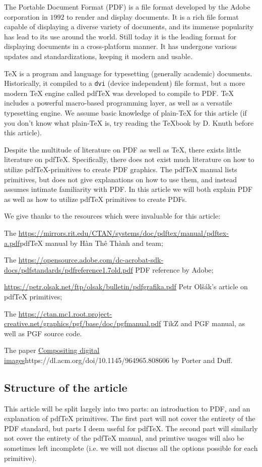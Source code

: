 The Portable Document Format (PDF) is a file format developed by the Adobe corporation in $1992$ to render and
display documents.
It is a rich file format capable of displaying a diverse variety of documents, and its immense popularity has
lead to its use around the world.
Still today it is the leading format for displaying documents in a cross-platform manner.
It has undergone various updates and standardizations, keeping it modern and usable.

\TeX{} is a program and language for typesetting (generally academic) documents.
Historically, it compiled to a {\tt dvi} (device independent) file format, but a more modern \TeX{} engine
called pdf\TeX{} was developed to compile to PDF.
\TeX{} includes a powerful macro-based programming layer, as well as a versatile typesetting engine.
We assume basic knowledge of plain-\TeX{} for this article (if you don't know what plain-\TeX{} is, try reading
the \TeX book by D. Knuth before this article).

Despite the multitude of literature on PDF as well as \TeX, there exists little literature on pdf\TeX.
Specifically, there does not exist much literature on how to utilize pdf\TeX-primitives to create PDF graphics.
The pdf\TeX{} manual lists primitives, but does not give explanations on how to use them, and instead assumes
intimate familiarity with PDF.
In this article we will both explain PDF as well as how to utilize pdf\TeX{} primitives to create PDFs.

We give thanks to the resources which were invaluable for this article:
\blist
    \item The \url{https://mirrors.rit.edu/CTAN/systems/doc/pdftex/manual/pdftex-a.pdf}{pdf\TeX{} manual} by
    H\`an Th\^e\llap{\raise 0.5ex\hbox{\'{}}} Th\`anh and team;
    \item The \url{https://opensource.adobe.com/dc-acrobat-sdk-docs/pdfstandards/pdfreference1.7old.pdf}
    {PDF reference} by Adobe;
    \item \url{https://petr.olsak.net/ftp/olsak/bulletin/pdfgrafika.pdf}
    {Petr Ol\v s\'ak's article on pdf\TeX{} primitives};
    \item The \url{https://ctan.mc1.root.project-creative.net/graphics/pgf/base/doc/pgfmanual.pdf}
    {TikZ and PGF manual}, as well as PGF source code.
    \item The paper \url{Compositing digital images}{https://dl.acm.org/doi/10.1145/964965.808606}
        by Porter and Duff.
\elist

\subsection*{Structure of the article}

This article will be split largely into two parts: an introduction to PDF, and an explanation of pdf\TeX{}
primitives.
The first part will not cover the entirety of the PDF standard, but parts I deem useful for pdf\TeX.
The second part will similarly not cover the entirety of the pdf\TeX{} manual, and primtive usages will also
be sometimes left incomplete (i.e. we will not discuss all the options possible for each primitive).

